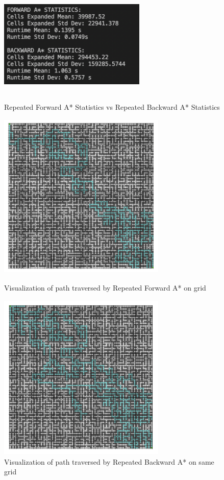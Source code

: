\documentclass[12pt, letterpaper]{article}
\begin{document}
\begin{figure}[p]
\centering
\includegraphics[width=7cm, height=5cm]{fvb_1}
\caption[margin=0.1cm]{Repeated Forward A* Statistics vs Repeated Backward A* Statistics}
\includegraphics[width=8cm, height=8cm]{forward_b1}
\caption[margin=0.1cm]{Visualization of path traversed by Repeated Forward A* on grid}
\includegraphics[width=8cm, height=8cm]{f_backward2}
\caption[margin=0.1cm]{Visualization of path traversed by Repeated Backward A* on same grid}
\end{figure}
\end{document}
